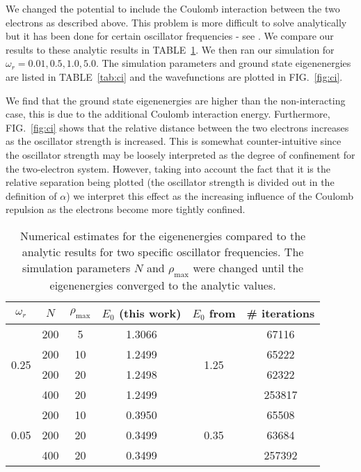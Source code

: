 \documentclass[10pt,showpacs,preprintnumbers,footinbib,amsmath,amssymb,aps,prl,twocolumn,groupedaddress,superscriptaddress,showkeys]{revtex4-1}
\newcommand{\rhomax}{
	\ensuremath{ \rho _{\mathrm{max}}} }
\begin{document}
{We changed the potential to include the Coulomb interaction between the two electrons
as described above.
This problem is more difficult to solve analytically but it has been done for certain oscillator
frequencies - see \citet{Taut1993}. We compare our results to these analytic results in
TABLE~\ref{tab:wrc}. We then ran our simulation for $\omega_r = 0.01,0.5,1.0,5.0$.
The simulation parameters and ground state eigenenergies are listed in TABLE~\ref{tab:ci}
and the wavefunctions are plotted in FIG.~\ref{fig:ci}.

We find that the ground state eigenenergies are higher than the non-interacting case,
this is due to the additional Coulomb interaction energy. Furthermore, FIG.~\ref{fig:ci}
shows that the relative distance between the two electrons increases as the oscillator strength
is increased. This is somewhat counter-intuitive since the oscillator strength may be loosely
interpreted as the degree of confinement for the two-electron system. However, taking into
account the fact that it is the relative separation being plotted (the oscillator strength is
divided out in the definition of $\alpha$) we interpret this effect as the increasing influence
of the Coulomb repulsion as the electrons become more tightly confined.

\begin{table}
\centering
	\begin{tabular}{ c | c c | c c | c }
	$\omega_r$ & $N$ & \rhomax & $E_0$ (this work) & $E_0$ from \citep{Taut1993} & \# iterations\\
\hline
	\multirow{4}{*}{0.25} & 200 &   5 &  1.3066 & \multirow{4}{*}{1.25} & 67116\\
				         & 200 & 10 &  1.2499 &                                      & 65222\\
				         & 200 & 20 &  1.2498 &                                      & 62322\\
				         & 400 & 20 &  1.2499 &                                      & 253817\\
\hline
	\multirow{3}{*}{0.05} & 200 & 10 &  0.3950 & \multirow{3}{*}{0.35} & 65508\\
				         & 200 & 20 & 0.3499  &                                      & 63684\\
				         & 400 & 20 & 0.3499  &                                      & 257392 
	\end{tabular}
	\caption{Numerical estimates for the eigenenergies compared to the analytic results
	for two specific oscillator frequencies. The simulation parameters $N$ and \rhomax
	were changed until the eigenenergies converged to the analytic values.}
	\label{tab:wrc}
\end{table}

}
\end{document}

